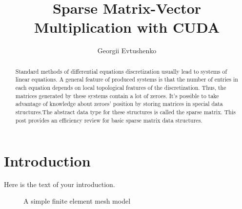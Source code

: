 \documentclass{article}
\begin{document}
\title{Sparse Matrix-Vector Multiplication with CUDA}
\author{Georgii Evtushenko}

\maketitle

\begin{abstract}
Standard methods of differential equations discretization usually lead to systems of linear equations. 
A general feature of produced systems is that the number of entries in each equation depends on local topological features of the discretization.
Thus, the matrices generated by these systems contain a lot of zeroes. It's possible to take advantage of knowledge about zeroes' position by 
storing matrices in special data structures.The abstract data type for these structures is called the sparse matrix. 
This post provides an efficiency review for basic sparse matrix data structures.
\end{abstract}

\section{Introduction}
Here is the text of your introduction.

\begin{figure}
  \centering
  \caption{A simple finite element mesh model}
\end{figure}
\end{document}

